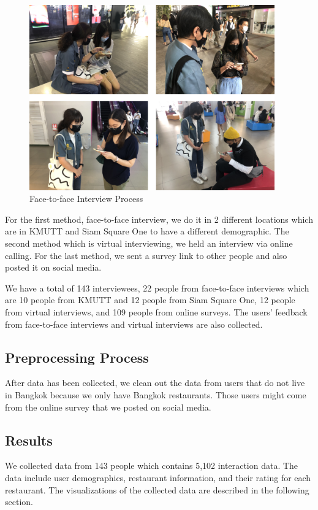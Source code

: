 \documentclass[12pt,oneside,openright,a4paper]{cpe-english-project}
\begin{document}
\newpage
\begin{figure}[H]\centering
\includegraphics[width=300pt]{./images/4FacetofaceInterviewProcess.png}
\caption{Face-to-face Interview Process}\label{fig:4FacetofaceInterviewProcess}
\end{figure}\vspace{-24pt}

For the first method, face-to-face interview, we do it in 2 different locations which are in KMUTT and Siam Square One to have a different demographic. The second method which is virtual interviewing, we held an interview via online calling. For the last method, we sent a survey link to other people and also posted it on social media.

We have a total of 143 interviewees, 22 people from face-to-face interviews which are 10 people from KMUTT and 12 people from Siam Square One, 12 people from virtual interviews, and 109 people from online surveys. The users' feedback from face-to-face interviews and virtual interviews are also collected.

\subsection{Preprocessing Process}

After data has been collected, we clean out the data from users that do not live in Bangkok because we only have Bangkok restaurants. Those users might come from the online survey that we posted on social media.

\subsection{Results}


We collected data from 143 people which contains 5,102 interaction data. The data include user demographics, restaurant information, and their rating for each restaurant. The visualizations of the collected data are described in the following section.
\end{document}
